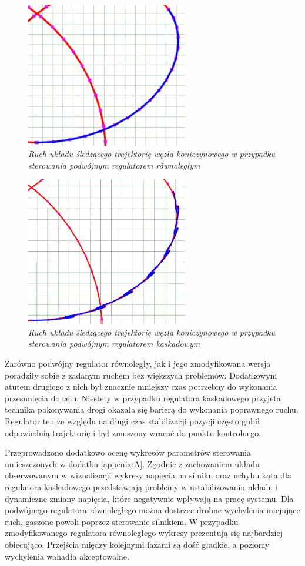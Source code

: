\documentclass[12pt, twoside, openany]{report}
\theoremstyle{definition}
\begin{document}
\begin{figure}[H]
	\centering
		\includegraphics[width = 200pt]{TrajectoryTrefoilKnotGood} 
		\caption{\textit{Ruch układu śledzącego trajektorię węzła koniczynowego w przypadku sterowania podwójnym regulatorem równoległym}}
		\label{TrajectoryTrefoilKnotGood}
\end{figure}

\begin{figure}[H]
	\centering
		\includegraphics[width = 200pt]{TrajectoryTrefoilKnotWrong} 
		\caption{\textit{Ruch układu śledzącego trajektorię węzła koniczynowego w przypadku sterowania podwójnym regulatorem kaskadowym}}
		\label{TrajectoryTrefoilKnotWrong}
\end{figure}

Zarówno podwójny regulator równoległy, jak i jego zmodyfikowana wersja poradziły sobie z zadanym ruchem bez większych problemów. Dodatkowym atutem drugiego z nich był znacznie mniejszy czas potrzebny do wykonania przesunięcia do celu. Niestety w przypadku regulatora kaskadowego przyjęta technika pokonywania drogi okazała się barierą do wykonania poprawnego ruchu. Regulator ten ze względu na długi czas stabilizacji pozycji często gubił odpowiednią trajektorię i był zmuszony wracać do punktu kontrolnego.

Przeprowadzono dodatkowo ocenę wykresów parametrów sterowania umieszczonych w dodatku \ref{appenix:A}. Zgodnie z zachowaniem układu obserwowanym w wizualizacji wykresy napięcia na silniku oraz uchybu kąta dla regulatora kaskadowego przedstawiają problemy w ustabilizowaniu układu i dynamiczne zmiany napięcia, które negatywnie wpływają na pracę systemu. Dla podwójnego regulatora równoległego można dostrzec drobne wychylenia inicjujące ruch, gaszone powoli poprzez sterowanie silnikiem. W przypadku zmodyfikowanego regulatora równoległego wykresy prezentują się najbardziej obiecująco. Przejścia między kolejnymi fazami są dość gładkie, a poziomy wychylenia wahadła akceptowalne.
\end{document}
